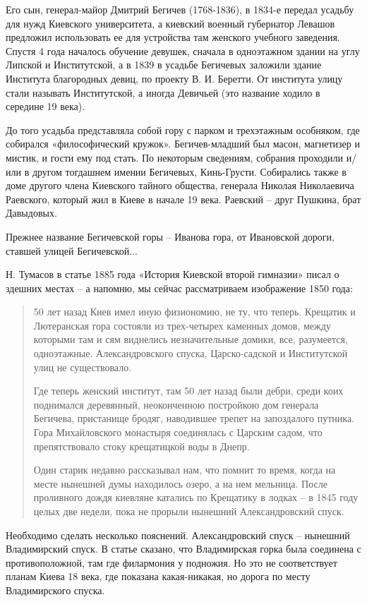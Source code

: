 Его сын, генерал-майор Дмитрий Бегичев (1768-1836), в 1834-е передал усадьбу для нужд Киевского университета, а киевский военный губернатор Левашов предложил использовать ее для устройства там женского учебного заведения. Спустя 4 года началось обучение девушек, сначала в одноэтажном здании на углу Липской и Институтской, а в 1839 в усадьбе Бегичевых заложили здание Института благородных девиц, по проекту  В. И. Беретти. От института улицу стали называть Институтской, а иногда Девичьей (это название ходило в середине 19 века).

До того усадьба представляла собой гору с парком и трехэтажным особняком, где собирался «философический кружок». Бегичев-младший был масон, магнетизер и мистик, и гости ему под стать. По некоторым сведениям, собрания проходили и/или в другом тогдашнем имении Бегичевых, Кинь-Грусти. Собирались также в доме другого члена Киевского тайного общества, генерала Николая Николаевича Раевского, который жил в Киеве в начале 19 века. Раевский – друг Пушкина, брат Давыдовых.

Прежнее название Бегичевской горы – Иванова гора, от Ивановской дороги, ставшей улицей Бегичевской...

Н. Тумасов в статье 1885 года «История Киевской второй гимназии» писал о здешних местах – а напомню, мы сейчас рассматриваем изображение 1850 года:

\begin{quotation}

50 лет назад Киев имел иную физиономию, не ту, что теперь. Крещатик и Лютеранская гора состояли из трех-четырех каменных домов, между которыми там и сям виднелись незначительные домики, все, разумеется, одноэтажные. Александровского спуска, Царско-садской и Институтской улиц не существовало.

Где теперь женский институт, там 50 лет назад были дебри, среди коих поднимался деревянный, неоконченною постройкою дом генерала Бегичева, пристанище бродяг, наводившее трепет на запоздалого путника. Гора Михайловского монастыря соединялась с Царским садом, что препятствовало стоку крещатицкой воды в Днепр.

Один старик недавно рассказывал нам, что помнит то время, когда на месте нынешней думы находилось озеро, а на нем мельница. После проливного дождя киевляне катались по Крещатику в лодках – в 1845 году целых две недели, пока не прорыли нынешний Александровский спуск.
\end{quotation}

Необходимо сделать несколько пояснений. Александровский спуск – нынешний Владимирский спуск. В статье сказано, что Владимирская горка была соединена с противоположной, там где филармония у подножия. Но это не соответствует планам Киева 18 века, где показана какая-никакая, но дорога по месту Владимирского спуска.

